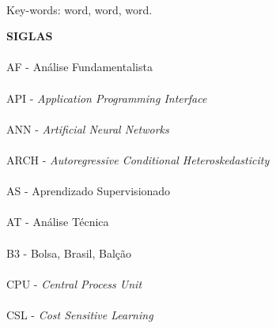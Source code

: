 \paragraph{}
\noindent Key-words: word, word, word.

\pagebreak


\begin{center}
\textbf{SIGLAS}
\end{center}
      \vspace{0.5cm}

\paragraph{}AF - Análise Fundamentalista
\paragraph{}API - \textit{Application Programming Interface}
\paragraph{}ANN - \textit{Artificial Neural Networks}
\paragraph{}ARCH - \textit{Autoregressive Conditional Heteroskedasticity}
\paragraph{}AS - Aprendizado Supervisionado
\paragraph{}AT - Análise Técnica
\paragraph{}B3 - Bolsa, Brasil, Balção
\paragraph{}CPU - \textit{Central Process Unit}
\paragraph{}CSL - \textit{Cost Sensitive Learning}
